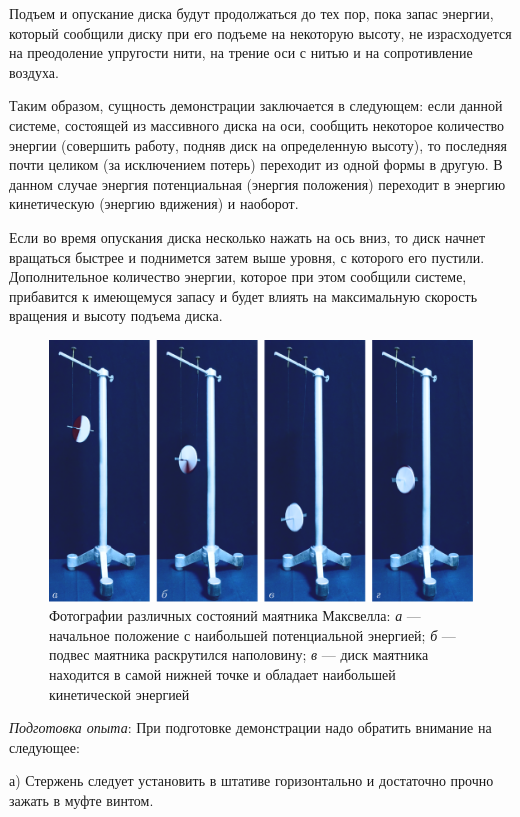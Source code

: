 \documentclass[All.tex]{subfiles}
\begin{document}
Подъем и опускание диска будут продолжаться до тех пор, пока запас энергии, который сообщили диску при его подъеме на некоторую высоту, не израсходуется на преодоление упругости нити, на трение оси с нитью и на сопротивление воздуха.

Таким образом, сущность демонстрации заключается в следующем: если данной системе, состоящей из массивного диска на оси, сообщить некоторое количество энергии (совершить работу, подняв диск на определенную высоту), то последняя почти целиком (за исключением потерь) переходит из одной формы в другую.
В данном случае энергия потенциальная (энергия положения) переходит в энергию кинетическую (энергию вдижения) и наоборот.

Если во время опускания диска несколько нажать на ось вниз, то диск начнет вращаться быстрее и поднимется затем выше уровня, с которого его пустили.
Дополнительное количество энергии, которое при этом сообщили системе, прибавится к имеющемуся запасу и будет влиять на максимальную скорость вращения и высоту подъема диска.
	
\begin{figure}[H] 	
\centering 	
\includegraphics[width=0.9\linewidth]{Maxwell-2.png}
\caption{Фотографии различных состояний маятника Максвелла: \textit{а} — начальное положение с наибольшей потенциальной энергией; \textit{б} — подвес маятника раскрутился наполовину; \textit{в} — диск маятника находится в самой нижней точке и обладает наибольшей кинетической энергией}
\label{Maxwell-2}
\end{figure}
	
\textit{Подготовка опыта}: При подготовке демонстрации надо обратить внимание на следующее:

а) Стержень следует установить в штативе горизонтально и достаточно прочно зажать в муфте винтом.
\end{document}
